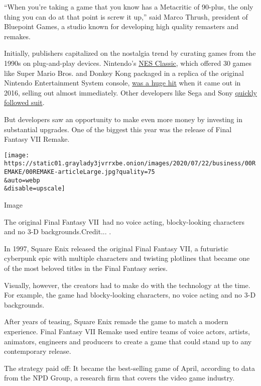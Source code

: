 ``When you're taking a game that you know has a Metacritic of 90-plus,
the only thing you can do at that point is screw it up,'' said Marco
Thrush, president of Bluepoint Games, a studio known for developing high
quality remasters and remakes.

Initially, publishers capitalized on the nostalgia trend by curating
games from the 1990s on plug-and-play devices. Nintendo's
\href{https://www.nytimes3xbfgragh.onion/2016/07/16/technology/nintendo-nes.html}{NES
Classic}, which offered 30 games like Super Mario Bros. and Donkey Kong
packaged in a replica of the original Nintendo Entertainment System
console,
\href{https://www.nytimes3xbfgragh.onion/2016/11/27/business/nintendos-new-console-may-feed-your-nostalgia-if-you-can-get-one.html}{was
a huge hit} when it came out in 2016, selling out almost immediately.
Other developers like Sega and Sony
\href{https://www.nytimes3xbfgragh.onion/2018/12/02/business/retro-video-games.html}{quickly
followed suit}.

But developers saw an opportunity to make even more money by investing
in substantial upgrades. One of the biggest this year was the release of
Final Fantasy VII Remake.

\texttt{[image: https://static01.graylady3jvrrxbe.onion/images/2020/07/22/business/00REMAKE/00REMAKE-articleLarge.jpg?quality=75\\\&auto=webp\\\&disable=upscale]}

Image

The original Final Fantasy VII~had no voice acting, blocky-looking
characters and no 3-D backgrounds.Credit... .

In 1997, Square Enix released the original Final Fantasy VII, a
futuristic cyberpunk epic with multiple characters and twisting
plotlines that became one of the most beloved titles in the Final
Fantasy series.

Visually, however, the creators had to make do with the technology at
the time. For example, the game had blocky-looking characters, no voice
acting and no 3-D backgrounds.

After years of teasing, Square Enix remade the game to match a modern
experience. Final Fantasy VII Remake used entire teams of voice actors,
artists, animators, engineers and producers to create a game that could
stand up to any contemporary release.

The strategy paid off: It became the best-selling game of April,
according to data from the NPD Group, a research firm that covers the
video game industry.

